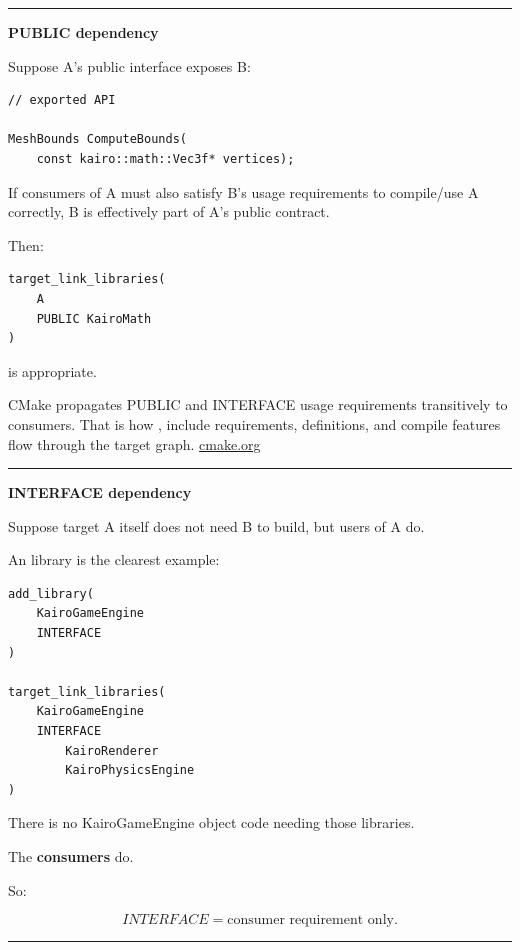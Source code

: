 \begin{center}\rule{0.5\linewidth}{0.5pt}\end{center}

\textbf{PUBLIC dependency}

Suppose A's public interface exposes B:

\begin{verbatim}
// exported API

MeshBounds ComputeBounds(
    const kairo::math::Vec3f* vertices);
\end{verbatim}

If consumers of A must also satisfy B's usage requirements to compile/use A correctly, B is effectively part of A's public contract.

Then:

\begin{verbatim}
target_link_libraries(
    A
    PUBLIC KairoMath
)
\end{verbatim}

is appropriate.

CMake propagates PUBLIC and INTERFACE usage requirements transitively to consumers. That is how , include requirements, definitions, and compile features flow through the target graph. \href{https://cmake.org/cmake/help/latest/prop_tgt/INTERFACE_LINK_LIBRARIES.html?utm_source=chatgpt.com}{cmake.org}

\begin{center}\rule{0.5\linewidth}{0.5pt}\end{center}

\textbf{INTERFACE dependency}

Suppose target A itself does not need B to build, but users of A do.

An  library is the clearest example:

\begin{verbatim}
add_library(
    KairoGameEngine
    INTERFACE
)

target_link_libraries(
    KairoGameEngine
    INTERFACE
        KairoRenderer
        KairoPhysicsEngine
)
\end{verbatim}

There is no KairoGameEngine object code needing those libraries.

The \textbf{consumers} do.

So:

\[
INTERFACE
=
\text{consumer requirement only}.
\]

\begin{center}\rule{0.5\linewidth}{0.5pt}\end{center}

